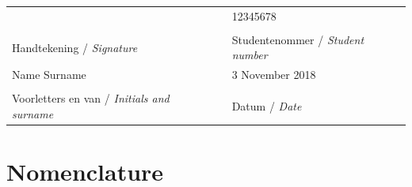 \documentclass[a4paper,12pt]{report}
\begin{document}
\begin{table}[ht]
	\begin{center}
		\begin{tabular*}{15.5cm}{@{\extracolsep{\fill}}lll}
               &   & 12345678\\
			\makebox[8cm]{\hrulefill} & & \makebox[6cm]{\hrulefill}\\
			Handtekening / \textit{Signature} & & Studentenommer / \textit{Student number}\\[1cm]
			Name Surname  & & 3 November 2018\\
			\makebox[8cm]{\hrulefill} & & \makebox[6cm]{\hrulefill}\\ 
			Voorletters en van / \textit{Initials and surname} & & Datum / \textit{Date} \\
		\end{tabular*}
	\end{center}
\end{table}
\newpage

%


\tableofcontents

\listoffigures

\listoftables
\chapter*{Nomenclature}
\printacronyms[include-classes=abbrev,name={List of Abbreviations}]
\printacronyms[include-classes=symbol,name={List of Symbols}]

\clearpage
{}



\appendix







\end{document}
